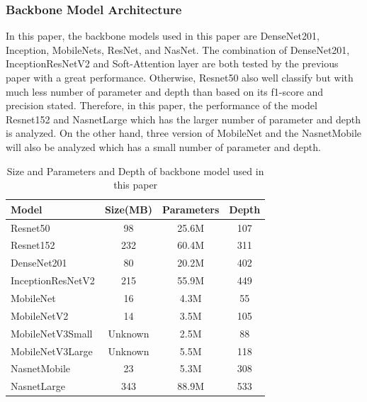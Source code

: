 \documentclass[sensors,article,submit,pdftex,moreauthors]{Definitions/mdpi}
\begin{document}
\subsubsection{Backbone Model Architecture}
In this paper, the backbone models used in this paper are DenseNet201\cite{06993}, Inception\cite{00567}, MobileNets\cite{04861}\cite{04381}\cite{02244}, ResNet\cite{03385}\cite{05027}, and NasNet\cite{07012}. The combination of DenseNet201, InceptionResNetV2 and Soft-Attention layer are both tested by the previous paper\cite{03358} with a great performance. Otherwise, Resnet50 also well classify but with much less number of parameter and depth than based on its f1-score and precision stated. Therefore, in this paper, the performance of the model Resnet152 and NasnetLarge which has the larger number of parameter and depth is analyzed. On the other hand, three version of MobileNet and the NasnetMobile will also be analyzed which has a small number of parameter and depth.  
\FloatBarrier
\begin{table}[ht]
	\centering
	\begin{tabular}{|l | c c c|} 
		\hline
		Model & Size(MB) & Parameters & Depth \\ 
		\hline
		Resnet50 & 98 & 25.6M & 107 \\ 
		\hline
		Resnet152 & 232 & 60.4M & 311 \\ 
		\hline
		DenseNet201 & 80 & 20.2M & 402 \\
		\hline
		InceptionResNetV2\cite{07261} & 215 & 55.9M & 449 \\
		\hline
		MobileNet & 16 & 4.3M & 55 \\ 
		\hline
		MobileNetV2 & 14 & 3.5M & 105 \\ 
		\hline
		MobileNetV3Small & Unknown & 2.5M & 88 \\ 
		\hline
		MobileNetV3Large & Unknown & 5.5M & 118 \\
		\hline
		NasnetMobile & 23 & 5.3M & 308 \\
		\hline
		NasnetLarge & 343 & 88.9M & 533 \\ 
		\hline
	\end{tabular}
	\caption{Size and Parameters and Depth of backbone model used in this paper}
	\label{table:2}
\end{table}
\FloatBarrier
\end{document}
